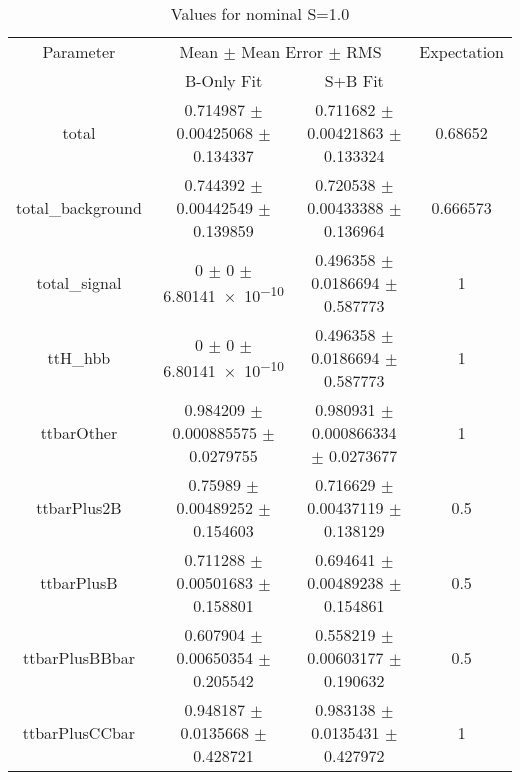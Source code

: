\begin{table}
\centering
\caption{Values for nominal S=1.0}
\begin{tabular}{cccc}
\toprule
Parameter & \multicolumn{2}{c}{Mean $\pm$ Mean Error $\pm$ RMS} & Expectation\\
 & B-Only Fit & S+B Fit & \\
\midrule
total & \num{0.714987} $\pm$ \num{0.00425068} $\pm$ \num{0.134337} & \num{0.711682} $\pm$ \num{0.00421863} $\pm$ \num{0.133324} & \num{0.68652}\\
total\_background & \num{0.744392} $\pm$ \num{0.00442549} $\pm$ \num{0.139859} & \num{0.720538} $\pm$ \num{0.00433388} $\pm$ \num{0.136964} & \num{0.666573}\\
total\_signal & \num{0} $\pm$ \num{0} $\pm$ \num{6.80141e-10} & \num{0.496358} $\pm$ \num{0.0186694} $\pm$ \num{0.587773} & \num{1}\\
ttH\_hbb & \num{0} $\pm$ \num{0} $\pm$ \num{6.80141e-10} & \num{0.496358} $\pm$ \num{0.0186694} $\pm$ \num{0.587773} & \num{1}\\
ttbarOther & \num{0.984209} $\pm$ \num{0.000885575} $\pm$ \num{0.0279755} & \num{0.980931} $\pm$ \num{0.000866334} $\pm$ \num{0.0273677} & \num{1}\\
ttbarPlus2B & \num{0.75989} $\pm$ \num{0.00489252} $\pm$ \num{0.154603} & \num{0.716629} $\pm$ \num{0.00437119} $\pm$ \num{0.138129} & \num{0.5}\\
ttbarPlusB & \num{0.711288} $\pm$ \num{0.00501683} $\pm$ \num{0.158801} & \num{0.694641} $\pm$ \num{0.00489238} $\pm$ \num{0.154861} & \num{0.5}\\
ttbarPlusBBbar & \num{0.607904} $\pm$ \num{0.00650354} $\pm$ \num{0.205542} & \num{0.558219} $\pm$ \num{0.00603177} $\pm$ \num{0.190632} & \num{0.5}\\
ttbarPlusCCbar & \num{0.948187} $\pm$ \num{0.0135668} $\pm$ \num{0.428721} & \num{0.983138} $\pm$ \num{0.0135431} $\pm$ \num{0.427972} & \num{1}\\
\bottomrule
\end{tabular}
\end{table}